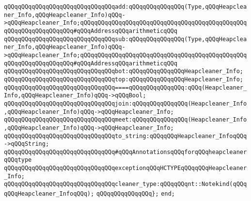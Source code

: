 \newline
\verb|qQQqqQQqqQQqqQQqqQQqqQQqqQQqqQQqadd:qQQqqQQqqQQqqQQq(Type,qQQqHeapcleaner_Info,qQQqHeapcleaner_Info)qQQq->qQQqHeapcleaner_Info;qQQqqQQqqQQqqQQqqQQqqQQqqQQqqQQqqQQqqQQqqQQqqQQqqQQqqQQqqQQqqQQqqQQq#qQQqAddressqQQqarithmeticqQQq|\newline
\verb|qQQqqQQqqQQqqQQqqQQqqQQqqQQqqQQqsub:qQQqqQQqqQQqqQQq(Type,qQQqHeapcleaner_Info,qQQqHeapcleaner_Info)qQQq->qQQqHeapcleaner_Info;qQQqqQQqqQQqqQQqqQQqqQQqqQQqqQQqqQQqqQQqqQQqqQQqqQQqqQQqqQQqqQQqqQQq#qQQqAddressqQQqarithmeticqQQq|\newline
\verb|qQQqqQQqqQQqqQQqqQQqqQQqqQQqqQQqbot:qQQqqQQqqQQqqQQqHeapcleaner_Info;|\newline
\verb|qQQqqQQqqQQqqQQqqQQqqQQqqQQqqQQqtop:qQQqqQQqqQQqqQQqHeapcleaner_Info;|\newline
\newline
\verb|qQQqqQQqqQQqqQQqqQQqqQQqqQQqqQQq====qQQqqQQqqQQqqQQq:qQQq(Heapcleaner_Info,qQQqHeapcleaner_Info)qQQq->qQQqBool;|\newline
\verb|qQQqqQQqqQQqqQQqqQQqqQQqqQQqqQQqjoin:qQQqqQQqqQQqqQQq(Heapcleaner_Info,qQQqHeapcleaner_Info)qQQq->qQQqHeapcleaner_Info;|\newline
\verb|qQQqqQQqqQQqqQQqqQQqqQQqqQQqqQQqmeet:qQQqqQQqqQQqqQQq(Heapcleaner_Info,qQQqHeapcleaner_Info)qQQq->qQQqHeapcleaner_Info;|\newline
\newline
\verb|qQQqqQQqqQQqqQQqqQQqqQQqqQQqqQQqto_string:qQQqqQQqHeapcleaner_InfoqQQq->qQQqString;|\newline
\newline
\newline
\verb|qQQqqQQqqQQqqQQqqQQqqQQqqQQqqQQq#qQQqAnnotationsqQQqforqQQqheapcleanerqQQqtype|\newline
\newline
\verb|qQQqqQQqqQQqqQQqqQQqqQQqqQQqqQQqexceptionqQQqHCTYPEqQQqqQQqHeapcleaner_Info;|\newline
\newline
\verb|qQQqqQQqqQQqqQQqqQQqqQQqqQQqqQQqcleaner_type:qQQqqQQqnt::Notekind(qQQqqQQqHeapcleaner_InfoqQQq);|\newline
\verb|qQQqqQQqqQQqqQQq};|\newline
\verb|end;|\newline

